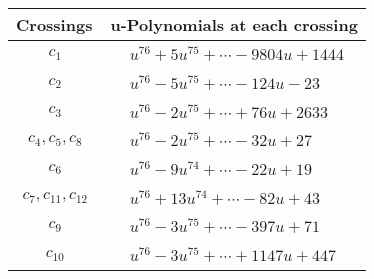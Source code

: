 \documentclass[1p]{elsarticle_modified}
\theoremstyle{definition}
\begin{document}
\begin{tabular}{m{50pt}|m{274pt}}
Crossings & \hspace{64pt}u-Polynomials at each crossing \\
\hline $$\begin{aligned}c_{1}\end{aligned}$$&$\begin{aligned}
&u^{76}+5 u^{75}+\cdots-9804 u+1444
\end{aligned}$\\
\hline $$\begin{aligned}c_{2}\end{aligned}$$&$\begin{aligned}
&u^{76}-5 u^{75}+\cdots-124 u-23
\end{aligned}$\\
\hline $$\begin{aligned}c_{3}\end{aligned}$$&$\begin{aligned}
&u^{76}-2 u^{75}+\cdots+76 u+2633
\end{aligned}$\\
\hline $$\begin{aligned}c_{4},c_{5},c_{8}\end{aligned}$$&$\begin{aligned}
&u^{76}-2 u^{75}+\cdots-32 u+27
\end{aligned}$\\
\hline $$\begin{aligned}c_{6}\end{aligned}$$&$\begin{aligned}
&u^{76}-9 u^{74}+\cdots-22 u+19
\end{aligned}$\\
\hline $$\begin{aligned}c_{7},c_{11},c_{12}\end{aligned}$$&$\begin{aligned}
&u^{76}+13 u^{74}+\cdots-82 u+43
\end{aligned}$\\
\hline $$\begin{aligned}c_{9}\end{aligned}$$&$\begin{aligned}
&u^{76}-3 u^{75}+\cdots-397 u+71
\end{aligned}$\\
\hline $$\begin{aligned}c_{10}\end{aligned}$$&$\begin{aligned}
&u^{76}-3 u^{75}+\cdots+1147 u+447
\end{aligned}$\\
\hline
\end{tabular}\\~\\
\end{document}
